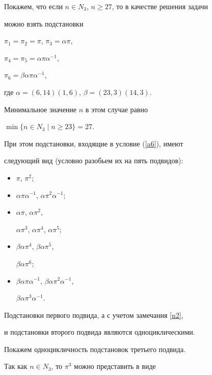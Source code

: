 \begin{pf}


Покажем, что если $n\in N_3$, $n\ge 27$, то в качестве решения задачи


можно взять подстановки


$\pi_1 = \pi_2 = \pi$, $\pi_3 = \alpha \pi$,


$\pi_4 = \pi_5 = \alpha \pi \alpha^{-1}$,


$\pi_6 = \beta \alpha \pi \alpha^{-1}$,


где $\alpha=(6,14)(1,6)$, $\beta=(23,3)(14,3)$.


Минимальное значение $n$ в этом случае равно


$\min \{n\in N_3\mid n\ge 23\}=27$.


При этом подстановки, входящие в условие (\ref{a6}), имеют


следующий вид (условно разобьем их на пять подвидов):


\begin{itemize}


\item[I.] $\pi$, $\pi^2$;


\item[II.] $\alpha \pi \alpha^{-1}$, $\alpha \pi^2 \alpha^{-1}$;


\item[III.] $\alpha \pi$, $\alpha \pi^2$,


$\alpha \pi^3$, $\alpha \pi^4$, $\alpha \pi^5$;


\item[IV.] $\beta \alpha \pi^4$, $\beta \alpha \pi^5$,


$\beta \alpha \pi^6$;


\item[V.] $\beta \alpha \pi \alpha^{-1}$, $\beta \alpha \pi^2 \alpha^{-1}$,


$\beta \alpha \pi^3 \alpha^{-1}$.


\end{itemize}





Подстановки первого подвида, а с учетом замечания \ref{n2},


и подстановки второго подвида являются одноциклическими.





Покажем одноцикличность подстановок третьего подвида.


Так как $n\in N_3$, то $ \pi^3$ можно представить в виде



\end{pf}
